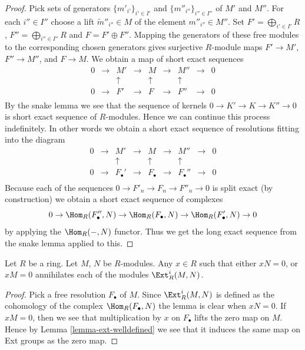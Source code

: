 \begin{proof}
Pick sets of generators $\{m'_{i'}\}_{i' \in I'}$ and
$\{m''_{i''}\}_{i'' \in I''}$ of $M'$ and $M''$.
For each $i'' \in I''$ choose a lift $\tilde m''_{i''} \in M$
of the element $m''_{i''} \in M''$. Set $F' = \bigoplus_{i' \in I'} R$,
$F'' = \bigoplus_{i'' \in I''} R$ and $F = F' \oplus F''$.
Mapping the generators of these free modules to the corresponding
chosen generators gives surjective $R$-module maps $F' \to M'$,
$F'' \to M''$, and $F \to M$. We obtain a map of short exact sequences
$$
\begin{matrix}
0 & \to & M' & \to & M & \to & M'' & \to & 0 \\
& & \uparrow & & \uparrow & & \uparrow \\
0 & \to & F' & \to & F & \to & F'' & \to & 0 \\
\end{matrix}
$$
By the snake lemma we see that the sequence of kernels
$0 \to K' \to K \to K'' \to 0$ is short exact sequence of $R$-modules.
Hence we can continue this process indefinitely. In other words
we obtain a short exact sequence of resolutions fitting into the diagram
$$
\begin{matrix}
0 & \to & M' & \to & M & \to & M'' & \to & 0 \\
& & \uparrow & & \uparrow & & \uparrow \\
0 & \to & F_\bullet' & \to & F_\bullet & \to & F_\bullet'' & \to & 0 \\
\end{matrix}
$$
Because each of the sequences $0 \to F'_n \to F_n \to F''_n \to 0$
is split exact (by construction) we obtain a short exact sequence of
complexes
$$
0 \to
\Hom_R(F''_{\bullet}, N) \to
\Hom_R(F_{\bullet}, N) \to
\Hom_R(F'_{\bullet}, N) \to
0
$$
by applying the $\Hom_R(-, N)$ functor.
Thus we get the long exact sequence from
the snake lemma applied to this.
\end{proof}

\begin{lemma}
\label{lemma-annihilate-ext}
Let $R$ be a ring. Let $M$, $N$ be $R$-modules.
Any $x\in R$ such that either $xN = 0$, or $xM = 0$
annihilates each of the modules $\Ext^i_R(M, N)$.
\end{lemma}

\begin{proof}
Pick a free resolution $F_{\bullet}$ of $M$.
Since $\Ext^i_R(M, N)$
is defined as the cohomology of the complex
$\Hom_R(F_{\bullet}, N)$ the lemma is
clear when $xN = 0$. If $xM = 0$, then
we see that multiplication by $x$ on $F_{\bullet}$
lifts the zero map on $M$. Hence by Lemma
\ref{lemma-ext-welldefined} we see that it
induces the same map on Ext groups as the
zero map.
\end{proof}

